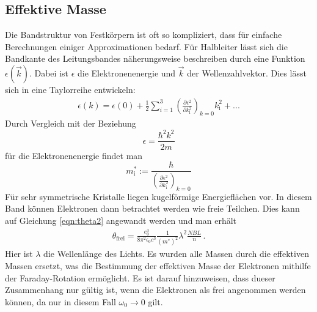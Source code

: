 \subsection{Effektive Masse}
\label{subsec:effmass}
Die Bandstruktur von Festkörpern ist oft so kompliziert, dass für einfache Berechnungen
einiger Approximationen bedarf. Für Halbleiter lässt sich die Bandkante des Leitungsbandes
näherungsweise beschreiben durch eine Funktion $\epsilon(\vec{k})$. Dabei ist
$\epsilon$ die Elektronenenergie und $\vec{k}$ der Wellenzahlvektor. Dies lässt sich
in eine Taylorreihe entwickeln:
\begin{align}
  \epsilon(k) = \epsilon (0) + \frac{1}{2} \sum_{i=1}^3 \left(\frac{\partial \epsilon^2}{\partial k^2_{\mathrm{i}}}\right)_{k=0} k_{\mathrm{i}}^2 + ...
  \label{eqn:taylor}
\end{align}
Durch Vergleich mit der Beziehung
\begin{equation}
  \epsilon = \frac{\hbar^2 k^2}{2m}
  \label{eqn:elektronenergie}
\end{equation}
für die Elektronenenergie findet man
\begin{equation}
   m^*_{\mathrm{i}} := \frac{\hbar}{\left(\frac{\partial \epsilon^2}{\partial k^2_{\mathrm{i}}}\right)_{k=0}}
   \label{eqn:effmass}
\end{equation}
Für sehr symmetrische Kristalle liegen kugelförmige Energieflächen vor. In diesem
Band können Elektronen dann betrachtet werden wie freie Teilchen. Dies kann auf
Gleichung \ref{eqn:theta2} angewandt werden und man erhält
\cite{Hier müssen wir uns einig sein. Ich bin dafür, theta frei als Winkel pro Länge zu definieren, so wie ich es auch in der neueren Anleitung ist.}
\begin{align}
  \theta_{\mathrm{frei}} = \frac{e^3_0}{8 \pi^2 \epsilon_0 c^3}\frac{1}{\left(m^{*}\right)^2} \lambda^2 \frac{NBL}{n} \,.
  \label{eqn:theta_frei}
\end{align}
Hier ist $\lambda$ die Wellenlänge des Lichts. Es wurden alle Massen durch die effektiven
Massen ersetzt, was die Bestimmung der effektiven Masse der Elektronen mithilfe der
Faraday-Rotation ermöglicht. Es ist darauf hinzuweisen, dass dueser Zusammenhang nur
gültig ist, wenn die Elektronen als frei angenommen werden können, da nur in diesem
Fall $\omega_0 \rightarrow 0$ gilt.

\cite{Rechtschreibung und weiteres prüfen}
